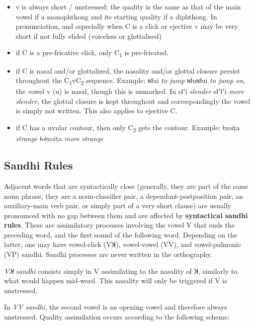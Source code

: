 \documentclass[11pt,a5paper]{book}
\newcommand{\qcn}[1]{\textcolor{AccentText}{\large#1}}
\newcommand{\transl}[2]{\qcn{#1} \emph{#2}}
\begin{document}
\begin{itemize}
	\item v is always short / unstressed; the quality is the same as that of the main vowel if a monophthong and its starting quality if a diphthong. In pronunciation, and especially when C is a click or ejective v may be very short if not fully elided (voiceless or glottalised)
	\item if C is a pre-fricative click, only C\textsubscript{1} is pre-fricated.
	\item if C is nasal and/or glottalized, the nasality and/or glottal closure persist throughout the C\textsubscript{1}vC\textsubscript{2} sequence. Example: \transl{ɴǁui}{to jump} \textrightarrow \transl{ɴǁuɴǁui}{to jump on}, the vowel v (\qcn{u}) is nasal, though this is unmarked. In \transl{sʇʼi}{slender} \textrightarrow \transl{sʇʼʇʼi}{more slender}, the glottal closure is kept throughout and correspondingly the vowel is simply not written. This also applies to ejective C.
	\item if C has a uvular contour, then only C\textsubscript{2} gets the contour. Example: \transl{ǂxoiṭa}{strange} \textrightarrow \transl{ǂoǂxoiṭa}{more strange}
\end{itemize}

\subsection{Sandhi Rules}

Adjacent words that are syntactically close (generally, they are part of the same noun phrase, they are a noun-classifier pair, a de\-pen\-dant-post\-po\-si\-tion pair, an auxiliary-main verb pair, or simply part of a very short clause) are usually pronounced with no gap between them and are affected by \textbf{syntactical sandhi rules}.  These are assimilatory processes involving the vowel V that ends the preceding word, and the first sound of the following word. Depending on the latter, one may have vowel-click (VꞰ), vowel-vowel (VV), and vowel-pulmonic (VP) sandhi. Sandhi processes are never written in the orthography.

\emph{VꞰ sandhi} consists simply in V assimilating to the nasality of Ʞ, similarly to what would happen mid-word. This nasality will only be triggered if V is unstressed.

In \emph{VV sandhi}, the second vowel is an opening vowel and therefore always unstressed. Quality assimilation occurs according to the following scheme:
\end{document}
